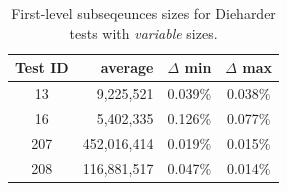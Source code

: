 \documentclass[
  digital,     %
  oneside,     %
  nosansbold,  %
  nocolorbold, %
  nolof,         %
  nolot,         %
]{fithesis4}
\begin{document}
\begin{table}[h]
  \begin{tabularx}{0.7\textwidth}{c|r|c|c}
    Test ID & average & $\Delta$ min & $\Delta$ max\\
    \midrule
    13 & 9,225,521 & 0.039\% & 0.038\%\\
    16 & 5,402,335 & 0.126\% & 0.077\%\\
    207 & 452,016,414 & 0.019\% & 0.015\%\\
    208 & 116,881,517 & 0.047\% & 0.014\%\\
 
  \end{tabularx}
  \caption{First-level subseqeunces sizes for Dieharder tests with \emph{variable} sizes.}
  \label{tab:analysis_dieharder_variable}
\end{table}
\end{document}
